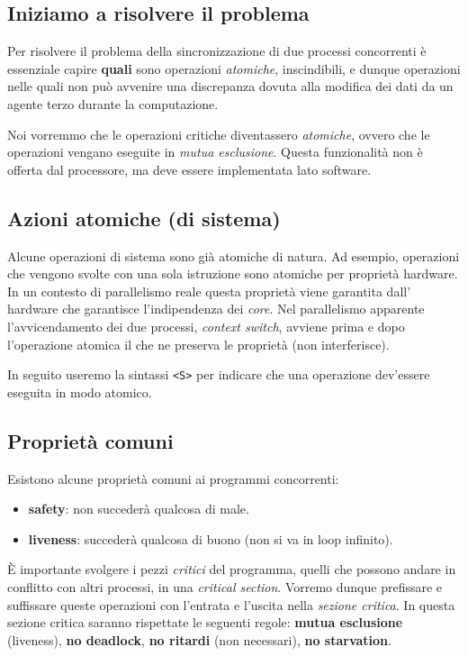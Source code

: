 \documentclass{article}
\begin{document}
\subsection{Iniziamo a risolvere il problema}

Per risolvere il problema della sincronizzazione di due processi concorrenti \`e essenziale
capire \textbf{quali} sono operazioni \emph{atomiche}, inscindibili, e dunque operazioni nelle quali
non pu\`o avvenire una discrepanza dovuta alla modifica dei dati da un agente terzo durante
la computazione.

Noi vorremmo che le operazioni critiche diventassero \emph{atomiche}, ovvero che le operazioni
vengano eseguite in \emph{mutua esclusione}. Questa funzionalit\`a non \`e offerta dal processore,
ma deve essere implementata lato software.

\subsection{Azioni atomiche (di sistema)}

Alcune operazioni di sistema sono gi\`a atomiche di natura. Ad esempio, operazioni che
vengono svolte con una sola istruzione sono atomiche per propriet\`a hardware.
In un contesto di parallelismo reale questa propriet\`a viene garantita dall'
hardware che garantisce l'indipendenza dei \emph{core}. Nel parallelismo
apparente l'avvicendamento dei due processi, \emph{context switch}, avviene prima
e dopo l'operazione atomica il che ne preserva le propriet\`a (non interferisce).

In seguito useremo la sintassi \verb!<S>! per indicare che una operazione dev'essere
eseguita in modo atomico.

\subsection{Propriet\`a comuni}

Esistono alcune propriet\`a comuni ai programmi concorrenti:
\begin{itemize}
  \item \textbf{safety}: non succeder\`a qualcosa di male.
  \item \textbf{liveness}: succeder\`a qualcosa di buono (non si va in loop infinito).
\end{itemize}

\`E importante svolgere i pezzi \emph{critici} del programma, quelli che possono
andare in conflitto con altri processi, in una \emph{critical section}. Vorremo dunque
prefissare e suffissare queste operazioni con l'entrata e l'uscita nella \emph{sezione critica}.
In questa sezione critica saranno rispettate le seguenti regole: \textbf{mutua esclusione}
(liveness), \textbf{no deadlock}, \textbf{no ritardi} (non necessari), \textbf{no starvation}.
\end{document}
